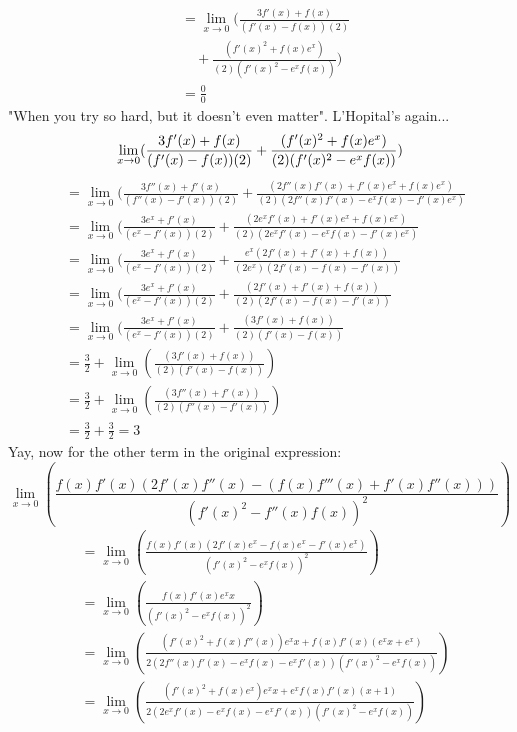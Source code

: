 \documentclass{article}
\begin{document}
\begin{enumerate}[label=\alph*.)]
\begin{align*}
&=  \lim_{x \rightarrow 0}(\frac{3f'(x) + f(x)}{(f'(x) - f(x))(2)} \\
&\quad + \frac{(f'(x)^2 + f(x)e^x)}{(2)(f'(x)^2 - e^xf(x))}) \\
&= \frac{0}{0}
\end{align*}
"When you try so hard, but it doesn't even matter". L'Hopital's again...\\
\[
\lim_{x \rightarrow 0}(\frac{3f'(x) + f(x)}{(f'(x) - f(x))(2)}+ \frac{(f'(x)^2 + f(x)e^x)}{(2)(f'(x)^2 - e^xf(x))}) \\
\]
\begin{align*}
&= \lim_{x \rightarrow 0}(\frac{3f''(x) + f'(x)}{(f''(x) - f'(x))(2)}+ \frac{(2f''(x)f'(x) + f'(x)e^x + f(x)e^x)}{(2)(2f''(x)f'(x) - e^xf(x) - f'(x)e^x)} \\
&= \lim_{x \rightarrow 0}(\frac{3e^x + f'(x)}{(e^x - f'(x))(2)}+ \frac{(2e^xf'(x) + f'(x)e^x + f(x)e^x)}{(2)(2e^xf'(x) - e^xf(x) - f'(x)e^x)} \\
&= \lim_{x \rightarrow 0}(\frac{3e^x + f'(x)}{(e^x - f'(x))(2)}+ \frac{e^x(2f'(x) + f'(x) + f(x))}{(2e^x)(2f'(x) - f(x) - f'(x))} \\
&= \lim_{x \rightarrow 0}(\frac{3e^x + f'(x)}{(e^x - f'(x))(2)}+ \frac{(2f'(x) + f'(x) + f(x))}{(2)(2f'(x) - f(x) - f'(x))} \\
&= \lim_{x \rightarrow 0}(\frac{3e^x + f'(x)}{(e^x - f'(x))(2)}+ \frac{(3f'(x) + f(x))}{(2)(f'(x) - f(x))} \\
&= \frac{3}{2}  + \lim_{x \rightarrow 0} (\frac{(3f'(x) + f(x))}{(2)(f'(x) - f(x))})\\
&= \frac{3}{2}  + \lim_{x \rightarrow 0} (\frac{(3f''(x) + f'(x))}{(2)(f''(x) - f'(x))}) \\
&= \frac{3}{2}  + \frac{3}{2} = 3
\end{align*}
Yay, now for the other term in the original expression: \\
\[
\lim_{x \rightarrow 0}(\frac{f(x)f'(x)(2f'(x)f''(x) - (f(x)f'''(x) + f'(x)f''(x)))}{(f'(x)^2 - f''(x)f(x))^2})
\]
\begin{align*}
&=\lim_{x \rightarrow 0}(\frac{f(x)f'(x)(2f'(x)e^x - f(x)e^x - f'(x)e^x)}{(f'(x)^2 - e^xf(x))^2})\\
&= \lim_{x \rightarrow 0}(\frac{f(x)f'(x)e^xx}{(f'(x)^2 - e^xf(x))^2})\\
&= \lim_{x \rightarrow 0}(\frac{(f'(x)^2 + f(x)f''(x))e^xx + f(x)f'(x)(e^xx + e^x)}{2(2f''(x)f'(x) - e^xf(x) - e^xf'(x))(f'(x)^2 - e^xf(x))})\\
&= \lim_{x \rightarrow 0}(\frac{(f'(x)^2 + f(x)e^x)e^xx + e^xf(x)f'(x)(x + 1)}{2(2e^xf'(x) - e^xf(x) - e^xf'(x))(f'(x)^2 - e^xf(x))})\\

\end{align*}
\end{enumerate}
\end{document}
